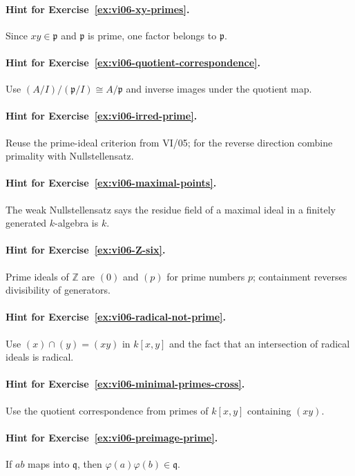 \paragraph{Hint for Exercise~\ref{ex:vi06-xy-primes}.} Since $xy\in\mathfrak p$ and $\mathfrak p$ is prime, one factor belongs to $\mathfrak p$.

\paragraph{Hint for Exercise~\ref{ex:vi06-quotient-correspondence}.} Use $(A/I)/(\mathfrak p/I)\cong A/\mathfrak p$ and inverse images under the quotient map.

\paragraph{Hint for Exercise~\ref{ex:vi06-irred-prime}.} Reuse the prime-ideal criterion from VI/05; for the reverse direction combine primality with Nullstellensatz.

\paragraph{Hint for Exercise~\ref{ex:vi06-maximal-points}.} The weak Nullstellensatz says the residue field of a maximal ideal in a finitely generated $k$-algebra is $k$.

\paragraph{Hint for Exercise~\ref{ex:vi06-Z-six}.} Prime ideals of $\mathbb Z$ are $(0)$ and $(p)$ for prime numbers $p$; containment reverses divisibility of generators.

\paragraph{Hint for Exercise~\ref{ex:vi06-radical-not-prime}.} Use $(x)\cap(y)=(xy)$ in $k[x,y]$ and the fact that an intersection of radical ideals is radical.

\paragraph{Hint for Exercise~\ref{ex:vi06-minimal-primes-cross}.} Use the quotient correspondence from primes of $k[x,y]$ containing $(xy)$.

\paragraph{Hint for Exercise~\ref{ex:vi06-preimage-prime}.} If $ab$ maps into $\mathfrak q$, then $\varphi(a)\varphi(b)\in\mathfrak q$.


